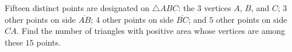 Fifteen distinct points are designated on $\triangle ABC$: the 3 vertices $A$,  $B$,  and $C$; $3$ other points on side $\overline{AB}$; $4$ other points on side $\overline{BC}$; and $5$ other points on side $\overline{CA}$. Find the number of triangles with positive area whose vertices are among these $15$ points.